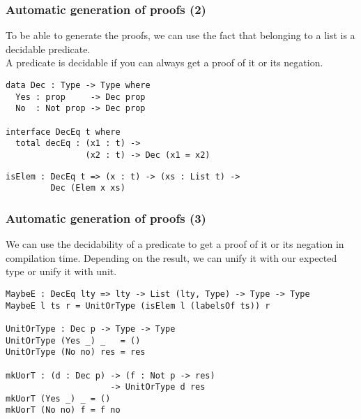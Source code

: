 \documentclass{beamer}
\begin{document}
\begin{frame}[fragile]
\frametitle{Automatic generation of proofs (2)}

To be able to generate the proofs, we can use the fact that belonging to a list is a decidable predicate. \\

A predicate is decidable if you can always get a proof of it or its negation.

\pause

\begin{definition}
\begin{verbatim}
data Dec : Type -> Type where
  Yes : prop     -> Dec prop
  No  : Not prop -> Dec prop

interface DecEq t where
  total decEq : (x1 : t) -> 
                (x2 : t) -> Dec (x1 = x2)
\end{verbatim}
\end{definition}

\pause

\begin{definition}
\begin{verbatim}
isElem : DecEq t => (x : t) -> (xs : List t) -> 
         Dec (Elem x xs)
\end{verbatim}
\end{definition}

\end{frame}


\begin{frame}[fragile]
\frametitle{Automatic generation of proofs (3)}

We can use the decidability of a predicate to get a proof of it or its negation in compilation time. Depending on the result, we can unify it with our expected type or unify it with unit.

\pause

\begin{definition}
\begin{verbatim}
MaybeE : DecEq lty => lty -> List (lty, Type) -> Type -> Type
MaybeE l ts r = UnitOrType (isElem l (labelsOf ts)) r

UnitOrType : Dec p -> Type -> Type
UnitOrType (Yes _) _   = ()
UnitOrType (No no) res = res

mkUorT : (d : Dec p) -> (f : Not p -> res)
                     -> UnitOrType d res
mkUorT (Yes _) _ = ()
mkUorT (No no) f = f no
\end{verbatim}
\end{definition}

\end{frame}
\end{document}
